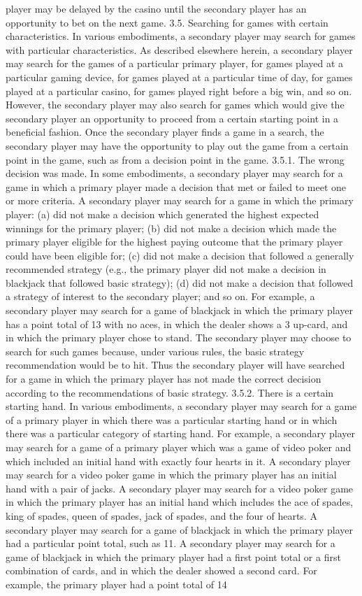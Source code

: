 \documentclass[11pt,a4paper]{article}
\begin{document}
player may be delayed by the casino until the secondary player has an opportunity to bet on the next game. 3.5. Searching for games with certain characteristics. In various embodiments, a secondary player may search for games with particular characteristics. As described elsewhere herein, a secondary player may search for the games of a particular primary player, for games played at a particular gaming device, for games played at a particular time of day, for games played at a particular casino, for games played right before a big win, and so on. However, the secondary player may also search for games which would give the secondary player an opportunity to proceed from a certain starting point in a beneficial fashion. Once the secondary player finds a game in a search, the secondary player may have the opportunity to play out the game from a certain point in the game, such as from a decision point in the game. 3.5.1. The wrong decision was made. In some embodiments, a secondary player may search for a game in which a primary player made a decision that met or failed to meet one or more criteria. A secondary player may search for a game in which the primary player: (a) did not make a decision which generated the highest expected winnings for the primary player; (b) did not make a decision which made the primary player eligible for the highest paying outcome that the primary player could have been eligible for; (c) did not make a decision that followed a generally recommended strategy (e.g., the primary player did not make a decision in blackjack that followed basic strategy); (d) did not make a decision that followed a strategy of interest to the secondary player; and so on. For example, a secondary player may search for a game of blackjack in which the primary player has a point total of 13 with no aces, in which the dealer shows a 3 up-card, and in which the primary player chose to stand. The secondary player may choose to search for such games because, under various rules, the basic strategy recommendation would be to hit. Thus the secondary player will have searched for a game in which the primary player has not made the correct decision according to the recommendations of basic strategy. 3.5.2. There is a certain starting hand. In various embodiments, a secondary player may search for a game of a primary player in which there was a particular starting hand or in which there was a particular category of starting hand. For example, a secondary player may search for a game of a primary player which was a game of video poker and which included an initial hand with exactly four hearts in it. A secondary player may search for a video poker game in which the primary player has an initial hand with a pair of jacks. A secondary player may search for a video poker game in which the primary player has an initial hand which includes the ace of spades, king of spades, queen of spades, jack of spades, and the four of hearts. A secondary player may search for a game of blackjack in which the primary player had a particular point total, such as 11. A secondary player may search for a game of blackjack in which the primary player had a first point total or a first combination of cards, and in which the dealer showed a second card. For example, the primary player had a point total of 14 
\end{document}

